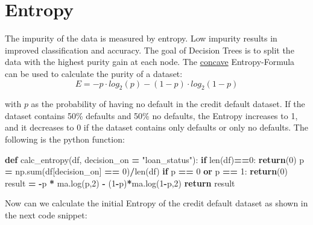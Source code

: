 \documentclass[
]{book}
\newenvironment{Shaded}{\begin{snugshade}}{\end{snugshade}}
\newcommand{\BuiltInTok}[1]{#1}
\newcommand{\ControlFlowTok}[1]{\textcolor[rgb]{0.13,0.29,0.53}{\textbf{#1}}}
\newcommand{\DecValTok}[1]{\textcolor[rgb]{0.00,0.00,0.81}{#1}}
\newcommand{\KeywordTok}[1]{\textcolor[rgb]{0.13,0.29,0.53}{\textbf{#1}}}
\newcommand{\NormalTok}[1]{#1}
\newcommand{\OperatorTok}[1]{\textcolor[rgb]{0.81,0.36,0.00}{\textbf{#1}}}
\newcommand{\StringTok}[1]{\textcolor[rgb]{0.31,0.60,0.02}{#1}}
\begin{document}
\hypertarget{entropy}{%
\section{Entropy}\label{entropy}}

The impurity of the data is measured by entropy. Low impurity results in improved classification and accuracy. The goal of Decision Trees is to split the data with the highest purity gain at each node. The \href{https://en.wikipedia.org/wiki/Concave_function}{concave} Entropy-Formula can be used to calculate the purity of a dataset:
\[
  E = -p \cdot log_2(p) - (1-p) \cdot log_2(1-p) 
\]

with \(p\) as the probability of having no default in the credit default dataset. If the dataset contains 50\% defaults and 50\% no defaults, the Entropy increases to 1, and it decreases to 0 if the dataset contains only defaults or only no defaults. The following is the python function:

\begin{Shaded}
\begin{Highlighting}[]
\KeywordTok{def}\NormalTok{ calc\_entropy(df, decision\_on }\OperatorTok{=} \StringTok{"loan\_status"}\NormalTok{):}
  \ControlFlowTok{if} \BuiltInTok{len}\NormalTok{(df)}\OperatorTok{==}\DecValTok{0}\NormalTok{:}
    \ControlFlowTok{return}\NormalTok{(}\DecValTok{0}\NormalTok{)}
\NormalTok{  p }\OperatorTok{=}\NormalTok{ np.}\BuiltInTok{sum}\NormalTok{(df[decision\_on] }\OperatorTok{==} \DecValTok{0}\NormalTok{)}\OperatorTok{/}\BuiltInTok{len}\NormalTok{(df)}
  \ControlFlowTok{if}\NormalTok{ p }\OperatorTok{==} \DecValTok{0} \KeywordTok{or}\NormalTok{ p }\OperatorTok{==} \DecValTok{1}\NormalTok{:}
    \ControlFlowTok{return}\NormalTok{(}\DecValTok{0}\NormalTok{)}
\NormalTok{  result }\OperatorTok{=} \OperatorTok{{-}}\NormalTok{p }\OperatorTok{*}\NormalTok{ ma.log(p,}\DecValTok{2}\NormalTok{) }\OperatorTok{{-}}\NormalTok{ (}\DecValTok{1}\OperatorTok{{-}}\NormalTok{p)}\OperatorTok{*}\NormalTok{ma.log(}\DecValTok{1}\OperatorTok{{-}}\NormalTok{p,}\DecValTok{2}\NormalTok{)}
  \ControlFlowTok{return}\NormalTok{ result}
\end{Highlighting}
\end{Shaded}

Now can we calculate the initial Entropy of the credit default dataset as shown in the next code snippet:
\end{document}
